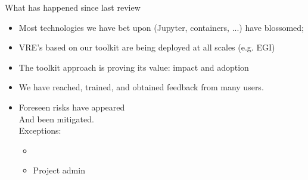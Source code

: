 \documentclass{beamer}
\begin{document}
\begin{frame}{What has happened since last review}
  \begin{itemize}
  \item Most technologies we have bet upon (Jupyter, containers, ...)
    have blossomed; \pause\bigskip
  \item VRE's based on our toolkit are being deployed at all scales
    (e.g. EGI)
    \pause\bigskip
  \item The toolkit approach is proving its value: impact and adoption
    \pause\bigskip
  \item We have reached, trained, and obtained feedback from many
    users.
    \pause\bigskip
  \item Foreseen risks have appeared
    \pause\\
    And been mitigated.\\
    Exceptions:
    \begin{itemize}
    \item 
    \item Project admin
    \end{itemize}
  \end{itemize}
\end{frame}
\end{document}
